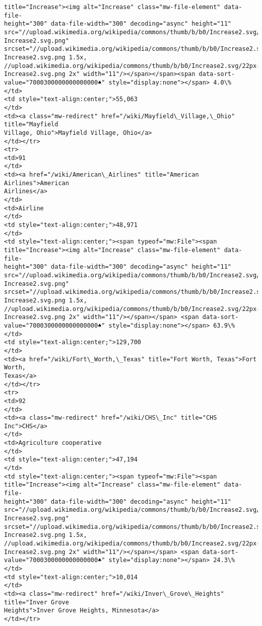 \documentclass[11pt]{article}
\begin{document}
\begin{Verbatim}[commandchars=\\\{\}]
title="Increase"><img alt="Increase" class="mw-file-element" data-file-
height="300" data-file-width="300" decoding="async" height="11"
src="//upload.wikimedia.org/wikipedia/commons/thumb/b/b0/Increase2.svg/11px-
Increase2.svg.png"
srcset="//upload.wikimedia.org/wikipedia/commons/thumb/b/b0/Increase2.svg/17px-
Increase2.svg.png 1.5x,
//upload.wikimedia.org/wikipedia/commons/thumb/b/b0/Increase2.svg/22px-
Increase2.svg.png 2x" width="11"/></span></span><span data-sort-
value="7000300000000000000♠" style="display:none"></span> 4.0\%
</td>
<td style="text-align:center;">55,063
</td>
<td><a class="mw-redirect" href="/wiki/Mayfield\_Village,\_Ohio" title="Mayfield
Village, Ohio">Mayfield Village, Ohio</a>
</td></tr>
<tr>
<td>91
</td>
<td><a href="/wiki/American\_Airlines" title="American Airlines">American
Airlines</a>
</td>
<td>Airline
</td>
<td style="text-align:center;">48,971
</td>
<td style="text-align:center;"><span typeof="mw:File"><span
title="Increase"><img alt="Increase" class="mw-file-element" data-file-
height="300" data-file-width="300" decoding="async" height="11"
src="//upload.wikimedia.org/wikipedia/commons/thumb/b/b0/Increase2.svg/11px-
Increase2.svg.png"
srcset="//upload.wikimedia.org/wikipedia/commons/thumb/b/b0/Increase2.svg/17px-
Increase2.svg.png 1.5x,
//upload.wikimedia.org/wikipedia/commons/thumb/b/b0/Increase2.svg/22px-
Increase2.svg.png 2x" width="11"/></span></span> <span data-sort-
value="7000300000000000000♠" style="display:none"></span> 63.9\%
</td>
<td style="text-align:center;">129,700
</td>
<td><a href="/wiki/Fort\_Worth,\_Texas" title="Fort Worth, Texas">Fort Worth,
Texas</a>
</td></tr>
<tr>
<td>92
</td>
<td><a class="mw-redirect" href="/wiki/CHS\_Inc" title="CHS Inc">CHS</a>
</td>
<td>Agriculture cooperative
</td>
<td style="text-align:center;">47,194
</td>
<td style="text-align:center;"><span typeof="mw:File"><span
title="Increase"><img alt="Increase" class="mw-file-element" data-file-
height="300" data-file-width="300" decoding="async" height="11"
src="//upload.wikimedia.org/wikipedia/commons/thumb/b/b0/Increase2.svg/11px-
Increase2.svg.png"
srcset="//upload.wikimedia.org/wikipedia/commons/thumb/b/b0/Increase2.svg/17px-
Increase2.svg.png 1.5x,
//upload.wikimedia.org/wikipedia/commons/thumb/b/b0/Increase2.svg/22px-
Increase2.svg.png 2x" width="11"/></span></span> <span data-sort-
value="7000300000000000000♠" style="display:none"></span> 24.3\%
</td>
<td style="text-align:center;">10,014
</td>
<td><a class="mw-redirect" href="/wiki/Inver\_Grove\_Heights" title="Inver Grove
Heights">Inver Grove Heights, Minnesota</a>
</td></tr>

\end{Verbatim}
\end{document}
